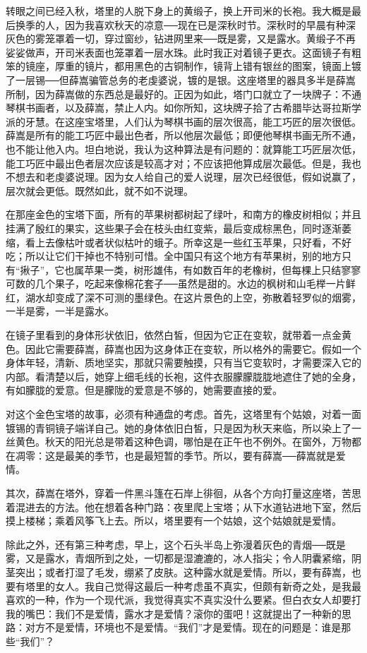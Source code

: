 转眼之间已经入秋，塔里的人脱下身上的黄缎子，换上开司米的长袍。我大概是最后换季的人，因为我喜欢秋天的凉意──现在已是深秋时节。深秋时的早晨有种深灰色的雾笼罩着一切，穿过窗纱，钻进网里来──既是雾，又是露水。黄缎子不再娑娑做声，开司米表面也笼罩着一层水珠。此时我正对着镜子更衣。这面镜子有粗笨的镜座，厚重的镜片，都用黑色的古铜制作，镜背上错有银丝的图案，镜面上镀了一层锡──但薛嵩骗管总务的老虔婆说，镀的是银。这座塔里的器具多半是薛嵩所制，因为薛嵩做的东西总是最好的。正因为如此，塔门口就立了一块牌子：不通琴棋书画者，以及薛嵩，禁止人内。如你所知，这块牌子拾了古希腊毕达哥拉斯学派的牙慧。在这座宝塔里，人们认为琴棋书画的层次很高，能工巧匠的层次很低。薛嵩是所有的能工巧匠中最出色者，所以他层次最低；即便他琴棋书画无所不通，也不能让他入内。坦白地说，我认为这种算法是有问题的：就算能工巧匠层次低，能工巧匠中最出色者层次应该是较高才对；不应该把他算成层次最低。但是，我也不想去和老虔婆说理。因为女人给自己的爱人说理，层次已经很低，假如说赢了，层次就会更低。既然如此，就不如不说理。 

在那座金色的宝塔下面，所有的苹果树都树起了绿叶，和南方的橡皮树相似；并且挂满了殷红的果实，这些果子会在枝头由红变紫，最后变成棕黑色，同时逐渐萎缩，看上去像枯叶或者状似枯叶的蛾子。所幸这是一些红玉苹果，只好看，不好吃；所以让它们干掉也不特别可惜。全中国只有这个地方有苹果树，别的地方只有“揪子”，它也属苹果一类，树形雄伟，有如数百年的老橡树，但每棵上只结寥寥可数的几个果子，吃起来像棉花套子──虽然是甜的。水边的枫树和山毛榉一片鲜红，湖水却变成了深不可测的墨绿色。在这片景色的上空，弥散着轻罗似的烟雾，一半是雾，一半是露水。 

在镜子里看到的身体形状依旧，依然白皙，但因为它正在变软，就带着一点金黄色。因此它需要薛嵩，薛嵩也因为这身体正在变软，所以格外的需要它。假如一个身体年轻，清新、质地坚实，那就只需要触摸，只有当它变软时，才需要深入它的内部。看清楚以后，她穿上细毛线的长袍，这件衣服朦朦胧胧地遮住了她的全身，有如朦胧的爱意。但是朦陇的爱意是不够的，她需要直接的爱。 

对这个金色宝塔的故事，必须有种通盘的考虑。首先，这塔里有个姑娘，对着一面镀锡的青铜镜子端详自己。她的身体依旧白皙，只是因为秋天来临，所以染上了一丝黄色。秋天的阳光总是带着这种色调，哪怕是在正午也不例外。在窗外，万物都在凋零：这是最美的季节，也是最短暂的季节。所以，要有薛嵩──薛嵩就是爱情。 

其次，薛嵩在塔外，穿着一件黑斗篷在石岸上徘徊，从各个方向打量这座塔，苦思着混进去的方法。他在想着各种门路：夜里爬上宝塔；从下水道钻进地下室，然后摸上楼梯；乘着风筝飞上去。所以，塔里要有一个姑娘，这个姑娘就是爱情。 

除此之外，还有第三种考虑，早上，这个石头半岛上弥漫着灰色的青烟──既是雾，又是露水，青烟所到之处，一切都是湿漉漉的，冰人指尖；令人阴囊紧缩，阴茎突出；或者打湿了毛发，绷紧了皮肤。这种露水就是爱情。所以，要有薛嵩，也要有塔里的女人。我自己觉得这最后一种考虑虽不真实，但颇有新奇之处，是我最喜欢的一种，作为一个现代派，我觉得真实不真实没什么要紧。但白衣女人却要打我的嘴巴：我们不是爱情，露水才是爱情？滚你的蛋吧！这就提出了一种新的思路：对方不是爱情，环境也不是爱情。“我们”才是爱情。现在的问题是：谁是那些“我们”？ 

